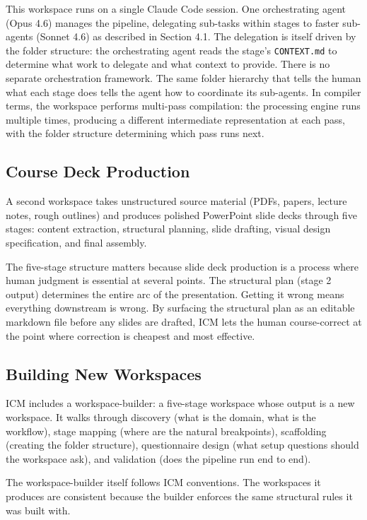 \documentclass[acmlarge,nonacm,screen]{acmart}
\begin{document}
This workspace runs on a single Claude Code session. One orchestrating agent (Opus 4.6) manages the pipeline, delegating sub-tasks within stages to faster sub-agents (Sonnet 4.6) as described in Section 4.1. The delegation is itself driven by the folder structure: the orchestrating agent reads the stage's \texttt{CONTEXT.md} to determine what work to delegate and what context to provide. There is no separate orchestration framework. The same folder hierarchy that tells the human what each stage does tells the agent how to coordinate its sub-agents. In compiler terms, the workspace performs multi-pass compilation: the processing engine runs multiple times, producing a different intermediate representation at each pass, with the folder structure determining which pass runs next.

\subsection{Course Deck Production}

A second workspace takes unstructured source material (PDFs, papers, lecture notes, rough outlines) and produces polished PowerPoint slide decks through five stages: content extraction, structural planning, slide drafting, visual design specification, and final assembly.

The five-stage structure matters because slide deck production is a process where human judgment is essential at several points. The structural plan (stage 2 output) determines the entire arc of the presentation. Getting it wrong means everything downstream is wrong. By surfacing the structural plan as an editable markdown file before any slides are drafted, ICM lets the human course-correct at the point where correction is cheapest and most effective.

\subsection{Building New Workspaces}

ICM includes a workspace-builder: a five-stage workspace whose output is a new workspace. It walks through discovery (what is the domain, what is the workflow), stage mapping (where are the natural breakpoints), scaffolding (creating the folder structure), questionnaire design (what setup questions should the workspace ask), and validation (does the pipeline run end to end).

The workspace-builder itself follows ICM conventions. The workspaces it produces are consistent because the builder enforces the same structural rules it was built with.
\end{document}
